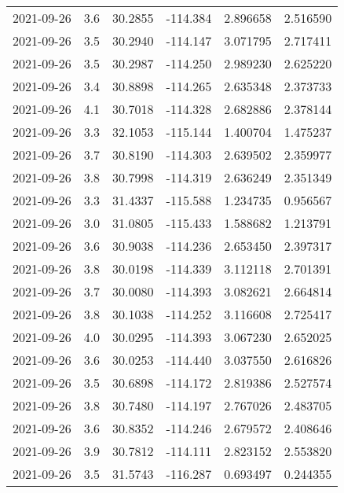 \begin{tabular}{lrrrrr}
2021-09-26 &       3.6 &  30.2855 &  -114.384 &         2.896658 &         2.516590 \\
2021-09-26 &       3.5 &  30.2940 &  -114.147 &         3.071795 &         2.717411 \\
2021-09-26 &       3.5 &  30.2987 &  -114.250 &         2.989230 &         2.625220 \\
2021-09-26 &       3.4 &  30.8898 &  -114.265 &         2.635348 &         2.373733 \\
2021-09-26 &       4.1 &  30.7018 &  -114.328 &         2.682886 &         2.378144 \\
2021-09-26 &       3.3 &  32.1053 &  -115.144 &         1.400704 &         1.475237 \\
2021-09-26 &       3.7 &  30.8190 &  -114.303 &         2.639502 &         2.359977 \\
2021-09-26 &       3.8 &  30.7998 &  -114.319 &         2.636249 &         2.351349 \\
2021-09-26 &       3.3 &  31.4337 &  -115.588 &         1.234735 &         0.956567 \\
2021-09-26 &       3.0 &  31.0805 &  -115.433 &         1.588682 &         1.213791 \\
2021-09-26 &       3.6 &  30.9038 &  -114.236 &         2.653450 &         2.397317 \\
2021-09-26 &       3.8 &  30.0198 &  -114.339 &         3.112118 &         2.701391 \\
2021-09-26 &       3.7 &  30.0080 &  -114.393 &         3.082621 &         2.664814 \\
2021-09-26 &       3.8 &  30.1038 &  -114.252 &         3.116608 &         2.725417 \\
2021-09-26 &       4.0 &  30.0295 &  -114.393 &         3.067230 &         2.652025 \\
2021-09-26 &       3.6 &  30.0253 &  -114.440 &         3.037550 &         2.616826 \\
2021-09-26 &       3.5 &  30.6898 &  -114.172 &         2.819386 &         2.527574 \\
2021-09-26 &       3.8 &  30.7480 &  -114.197 &         2.767026 &         2.483705 \\
2021-09-26 &       3.6 &  30.8352 &  -114.246 &         2.679572 &         2.408646 \\
2021-09-26 &       3.9 &  30.7812 &  -114.111 &         2.823152 &         2.553820 \\
2021-09-26 &       3.5 &  31.5743 &  -116.287 &         0.693497 &         0.244355 \\

\end{tabular}
